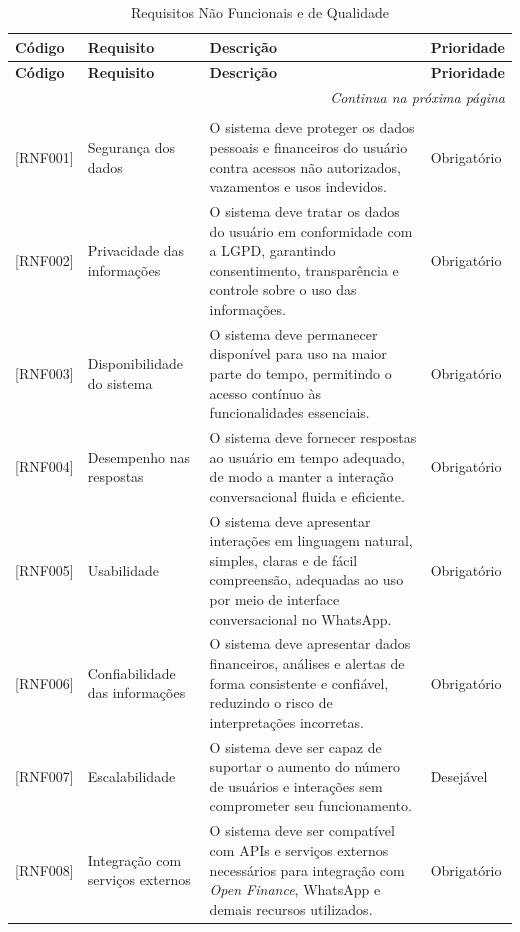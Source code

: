 \begin{longtable}{|p{1.8cm}|p{3.2cm}|p{7.0cm}|p{2.1cm}|}
\caption{Requisitos Não Funcionais e de Qualidade} \label{quad:rnf} \\
\hline
\textbf{Código} & \textbf{Requisito} & \textbf{Descrição} & \textbf{Prioridade} \\ \hline
\endfirsthead
\hline
\textbf{Código} & \textbf{Requisito} & \textbf{Descrição} & \textbf{Prioridade} \\ \hline
\endhead
\hline
\multicolumn{4}{r}{\fontsize{10pt}{10pt}\selectfont\textit{Continua na próxima página}} \\
\endfoot
\hline
\multicolumn{4}{c}{\fontsize{10pt}{10pt}\selectfont \textbf{Fonte:} Elaborado pelos autores (2026).} \\
\endlastfoot
{[RNF001]} & Segurança dos dados & O sistema deve proteger os dados pessoais e financeiros do usuário contra acessos não autorizados, vazamentos e usos indevidos. & Obrigatório \\ \hline
{[RNF002]} & Privacidade das informações & O sistema deve tratar os dados do usuário em conformidade com a LGPD, garantindo consentimento, transparência e controle sobre o uso das informações. & Obrigatório \\ \hline
{[RNF003]} & Disponibilidade do sistema & O sistema deve permanecer disponível para uso na maior parte do tempo, permitindo o acesso contínuo às funcionalidades essenciais. & Obrigatório \\ \hline
{[RNF004]} & Desempenho nas respostas & O sistema deve fornecer respostas ao usuário em tempo adequado, de modo a manter a interação conversacional fluida e eficiente. & Obrigatório \\ \hline
{[RNF005]} & Usabilidade & O sistema deve apresentar interações em linguagem natural, simples, claras e de fácil compreensão, adequadas ao uso por meio de interface conversacional no WhatsApp. & Obrigatório \\ \hline
{[RNF006]} & Confiabilidade das informações & O sistema deve apresentar dados financeiros, análises e alertas de forma consistente e confiável, reduzindo o risco de interpretações incorretas. & Obrigatório \\ \hline
{[RNF007]} & Escalabilidade & O sistema deve ser capaz de suportar o aumento do número de usuários e interações sem comprometer seu funcionamento. & Desejável \\ \hline
{[RNF008]} & Integração com serviços externos & O sistema deve ser compatível com APIs e serviços externos necessários para integração com \textit{Open Finance}, WhatsApp e demais recursos utilizados. & Obrigatório \\ \hline

\end{longtable}
